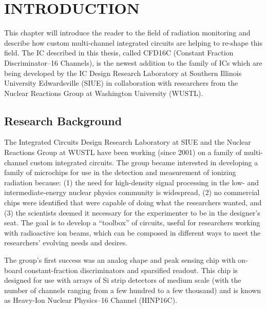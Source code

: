 \documentclass[12pt,oneside,final]{siuethesis}
\theoremstyle{definition}
\begin{document}
\cleardoublepage
\mainmatter %

\chapter{INTRODUCTION}  %
\setcounter{chapter}{1}
\thispagestyle{empty} %
\par This chapter will introduce the reader to the field of radiation monitoring and describe how custom multi-channel integrated circuits are helping to re-shape this field.  The IC described in this thesis, called CFD16C (Constant Fraction Discriminator--16 Channels), is the newest addition to the family of ICs which are being developed by the IC Design Research Laboratory at Southern Illinois University Edwardsville (SIUE) in collaboration with researchers from the Nuclear Reactions Group at Washington University (WUSTL).

\section{Research Background}

The Integrated Circuits Design Research Laboratory at SIUE and the Nuclear Reactions Group at WUSTL have been working (since 2001) on a family of multi-channel custom integrated circuits.  The group became interested in developing a family of microchips for use in the detection and measurement of ionizing radiation because: (1) the need for high-density signal processing in the low- and intermediate-energy nuclear physics community is widespread, (2) no commercial chips were identified that were capable of doing what the researchers wanted, and (3) the scientists deemed it necessary for the experimenter to be in the designer's seat. The goal is to develop a ``toolbox'' of circuits,
useful for researchers working with radioactive ion beams, which can be composed in different ways to meet the researchers' evolving needs and desires.

 
The group's first success was an analog shape and peak sensing chip with on-board constant-fraction discriminators and
sparsified readout. This chip is designed for use with arrays of Si strip detectors of medium scale (with the number of channels ranging from a few hundred to a few thousand) and is known as Heavy-Ion Nuclear Physics--16 Channel (HINP16C). 
\end{document}
